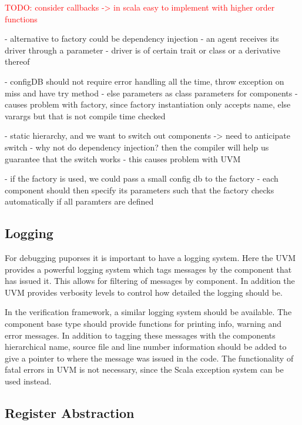 \documentclass[11pt,a4paper]{report}
\newcommand{\todo}[1]{\textcolor{red}{TODO: #1}}
\begin{document}
\todo{consider callbacks -> in scala easy to implement with higher order functions}

- alternative to factory could be dependency injection
- an agent receives its driver through a parameter
- driver is of certain trait or class or a derivative thereof

- configDB should not require error handling all the time, throw exception on miss and have try method
- else parameters as class parameters for components
- causes problem with factory, since factory instantiation only accepts name, else varargs but that is not compile time checked

- static hierarchy, and we want to switch out components -> need to anticipate switch
- why not do dependency injection? then the compiler will help us guarantee that the switch works
- this causes problem with UVM

- if the factory is used, we could pass a small config db to the factory
- each component should then specify its parameters such that the factory checks automatically if all paramters are defined

\subsection{Logging} %
\label{sec:logging}

For debugging puporses it is important to have a logging system. Here the UVM provides a powerful logging system
which tags messages by the component that has issued it. This allows for filtering of messages by component. In
addition the UVM provides verbosity levels to control how detailed the logging should be.

In the verification framework, a similar logging system should be available. The component base type should provide
functions for printing info, warning and error messages. In addition to tagging these messages with the components
hierarchical name, source file and line number information should be added to give a pointer to where the message was
issued in the code. The functionality of fatal errors in UVM is not necessary, since the Scala exception system can
be used instead.

\subsection{Register Abstraction} %
\end{document}

